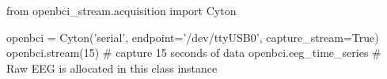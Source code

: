 \begin{python}
from openbci_stream.acquisition import Cyton

openbci = Cyton('serial', endpoint='/dev/ttyUSB0', capture_stream=True)
openbci.stream(15)  # capture 15 seconds of data
openbci.eeg_time_series # Raw EEG is allocated in this class instance
\end{python}